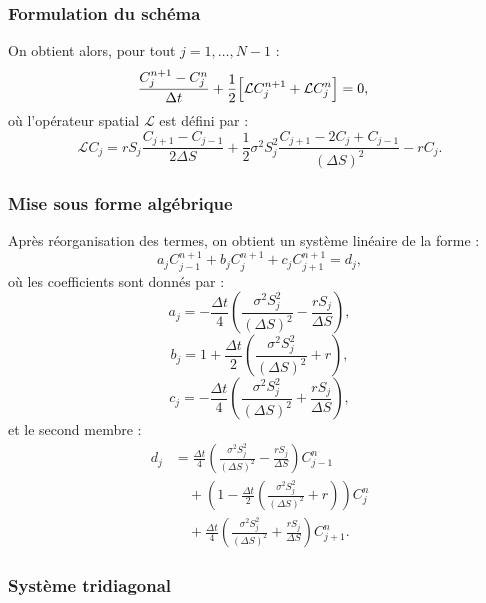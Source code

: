 \documentclass[12pt,a4paper]{article}
\begin{document}
\subsubsection*{Formulation du schéma}

On obtient alors, pour tout $j=1,\dots,N-1$ :
\begin{align}
\frac{C_j^{n+1} - C_j^n}{\Delta t}
&+
\frac{1}{2}
\Bigl[
\mathcal{L} C^{n+1}_j
+
\mathcal{L} C^{n}_j
\Bigr]
= 0,
\end{align}
où l’opérateur spatial $\mathcal{L}$ est défini par :
\[
\mathcal{L} C_j
=
rS_j \frac{C_{j+1} - C_{j-1}}{2\Delta S}
+
\frac{1}{2}\sigma^2 S_j^2
\frac{C_{j+1} - 2C_j + C_{j-1}}{(\Delta S)^2}
- rC_j.
\]

\subsubsection*{Mise sous forme algébrique}

Après réorganisation des termes, on obtient un système linéaire de la forme :
\[
a_j C_{j-1}^{n+1}
+ b_j C_j^{n+1}
+ c_j C_{j+1}^{n+1}
=
d_j,
\]
où les coefficients sont donnés par :
\[
a_j =
-\frac{\Delta t}{4}
\left(
\frac{\sigma^2 S_j^2}{(\Delta S)^2}
-
\frac{rS_j}{\Delta S}
\right),
\]
\[
b_j =
1
+
\frac{\Delta t}{2}
\left(
\frac{\sigma^2 S_j^2}{(\Delta S)^2}
+
r
\right),
\]
\[
c_j =
-\frac{\Delta t}{4}
\left(
\frac{\sigma^2 S_j^2}{(\Delta S)^2}
+
\frac{rS_j}{\Delta S}
\right),
\]
et le second membre :
\begin{align}
d_j &=
\frac{\Delta t}{4}
\left(
\frac{\sigma^2 S_j^2}{(\Delta S)^2}
-
\frac{rS_j}{\Delta S}
\right)
C_{j-1}^{n}
\\
&\quad
+
\left(
1
-
\frac{\Delta t}{2}
\left(
\frac{\sigma^2 S_j^2}{(\Delta S)^2}
+
r
\right)
\right)
C_j^{n}
\\
&\quad
+
\frac{\Delta t}{4}
\left(
\frac{\sigma^2 S_j^2}{(\Delta S)^2}
+
\frac{rS_j}{\Delta S}
\right)
C_{j+1}^{n}.
\end{align}

\subsubsection*{Système tridiagonal}
\end{document}
